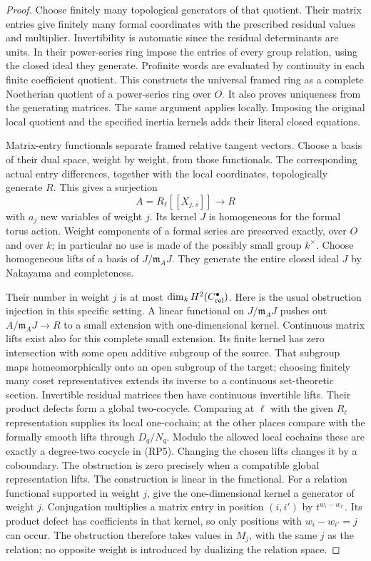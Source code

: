\begin{proof}
Choose finitely many topological generators of that quotient.  Their
matrix entries give finitely many formal coordinates with the prescribed
residual values and multiplier.  Invertibility is automatic since the
residual determinants are units.  In their power-series ring impose
the entries of every group relation, using the closed ideal they
generate.  Profinite words are evaluated by continuity in each finite
coefficient quotient.  This constructs the universal framed ring as
a complete Noetherian quotient of a power-series ring over $O$.
It also proves uniqueness from the generating matrices.  The same
argument applies locally.  Imposing the original local quotient and
the specified inertia kernels adds their literal closed equations.

Matrix-entry functionals separate framed relative tangent vectors.
Choose a basis of their dual space, weight by weight, from those
functionals.  The corresponding actual entry differences, together
with the local coordinates, topologically generate $R$.  This gives
a surjection
\[
                   A=R_\ell[[X_{j,s}]]\longrightarrow R
\]
with $a_j$ new variables of weight $j$.  Its kernel $J$ is
homogeneous for the formal torus action.  Weight components of a
formal series are preserved exactly, over $O$ and over $k$; in
particular no use is made of the possibly small group $k^\times$.
Choose homogeneous lifts of a basis of $J/\mathfrak m_AJ$.
They generate the entire closed ideal $J$ by Nakayama and completeness.

Their number in weight $j$ is at most
$\dim_kH^2(C_{\rm rel}^\bullet)$.  Here is the usual obstruction
injection in this specific setting.  A linear functional on
$J/\mathfrak m_AJ$ pushes out
$A/\mathfrak m_AJ\to R$ to a small extension with one-dimensional
kernel.  Continuous matrix lifts exist also for this complete small
extension.  Its finite kernel has zero intersection with some open
additive subgroup of the source.  That subgroup maps homeomorphically
onto an open subgroup of the target; choosing finitely many coset
representatives extends its inverse to a continuous set-theoretic
section.  Invertible residual matrices then have continuous invertible
lifts.  Their product
defects form a global two-cocycle.  Comparing at $\ell$ with the
given $R_\ell$ representation supplies its local one-cochain;
at the other places compare with the formally smooth lifts through
$D_q/N_q$.  Modulo the allowed local cochains these are exactly a
degree-two cocycle in (RP5).  Changing the chosen lifts changes it by
a coboundary.  The obstruction is zero precisely when a compatible
global representation lifts.  The construction is linear in the
functional.  For a relation functional supported in weight $j$, give
the one-dimensional kernel a generator of weight $j$.  Conjugation
multiplies a matrix entry in position $(i,i')$ by
$t^{w_i-w_{i'}}$.  Its product defect has coefficients in that kernel,
so only positions with $w_i-w_{i'}=j$ can occur.  The obstruction
therefore takes values in $M_j$, with the same $j$ as the relation;
no opposite weight is introduced by dualizing the relation space.


\end{proof}
